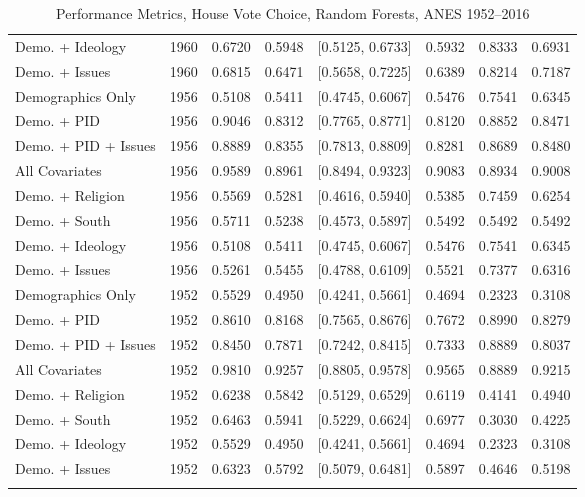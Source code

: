 \begin{longtable}{lrrrlrrr}
  Demo. + Ideology & 1960 & 0.6720 & 0.5948 & [0.5125, 0.6733] & 0.5932 & 0.8333 & 0.6931 \\ 
  Demo. + Issues & 1960 & 0.6815 & 0.6471 & [0.5658, 0.7225] & 0.6389 & 0.8214 & 0.7187 \\ 
  Demographics Only & 1956 & 0.5108 & 0.5411 & [0.4745, 0.6067] & 0.5476 & 0.7541 & 0.6345 \\ 
  Demo. + PID & 1956 & 0.9046 & 0.8312 & [0.7765, 0.8771] & 0.8120 & 0.8852 & 0.8471 \\ 
  Demo. + PID + Issues & 1956 & 0.8889 & 0.8355 & [0.7813, 0.8809] & 0.8281 & 0.8689 & 0.8480 \\ 
  All Covariates & 1956 & 0.9589 & 0.8961 & [0.8494, 0.9323] & 0.9083 & 0.8934 & 0.9008 \\ 
  Demo. + Religion & 1956 & 0.5569 & 0.5281 & [0.4616, 0.5940] & 0.5385 & 0.7459 & 0.6254 \\ 
  Demo. + South & 1956 & 0.5711 & 0.5238 & [0.4573, 0.5897] & 0.5492 & 0.5492 & 0.5492 \\ 
  Demo. + Ideology & 1956 & 0.5108 & 0.5411 & [0.4745, 0.6067] & 0.5476 & 0.7541 & 0.6345 \\ 
  Demo. + Issues & 1956 & 0.5261 & 0.5455 & [0.4788, 0.6109] & 0.5521 & 0.7377 & 0.6316 \\ 
  Demographics Only & 1952 & 0.5529 & 0.4950 & [0.4241, 0.5661] & 0.4694 & 0.2323 & 0.3108 \\ 
  Demo. + PID & 1952 & 0.8610 & 0.8168 & [0.7565, 0.8676] & 0.7672 & 0.8990 & 0.8279 \\ 
  Demo. + PID + Issues & 1952 & 0.8450 & 0.7871 & [0.7242, 0.8415] & 0.7333 & 0.8889 & 0.8037 \\ 
  All Covariates & 1952 & 0.9810 & 0.9257 & [0.8805, 0.9578] & 0.9565 & 0.8889 & 0.9215 \\ 
  Demo. + Religion & 1952 & 0.6238 & 0.5842 & [0.5129, 0.6529] & 0.6119 & 0.4141 & 0.4940 \\ 
  Demo. + South & 1952 & 0.6463 & 0.5941 & [0.5229, 0.6624] & 0.6977 & 0.3030 & 0.4225 \\ 
  Demo. + Ideology & 1952 & 0.5529 & 0.4950 & [0.4241, 0.5661] & 0.4694 & 0.2323 & 0.3108 \\ 
  Demo. + Issues & 1952 & 0.6323 & 0.5792 & [0.5079, 0.6481] & 0.5897 & 0.4646 & 0.5198 \\ 
   \bottomrule
\caption{Performance Metrics, House Vote Choice, Random Forests, ANES 1952--2016} 
\label{tab:ANES_house_rf}
\end{longtable}
